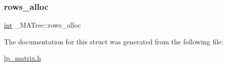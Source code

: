\subsubsection{\texorpdfstring{rows\+\_\+alloc}{rows\_alloc}}
{\footnotesize\ttfamily \hyperlink{lp__lib_8h_adeb9ec6400320e4923ac9d836d509ddb}{int} \+\_\+\+M\+A\+Trec\+::rows\+\_\+alloc}



The documentation for this struct was generated from the following file\+:\begin{DoxyCompactItemize}
\item 
\hyperlink{lp__matrix_8h}{lp\+\_\+matrix.\+h}\end{DoxyCompactItemize}
